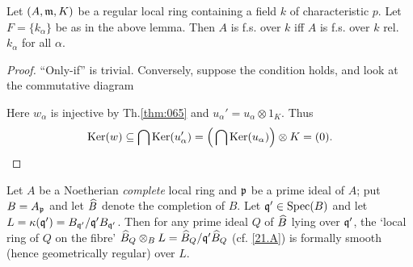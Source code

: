 \documentclass[../main]{subfiles}
\begin{document}
\begin{theorem}
\label{thm:067}
Let $(A, \mathfrak{m}, K)$ be a regular local ring containing a field $k$ of characteristic $p$. Let $F = \{k_\alpha\}$ be as in the above lemma. Then $A$ is f.s. over $k$ iff $A$ is f.s. over $k$ rel. $k_\alpha$ for all $\alpha$. 
\end{theorem}

\begin{proof}
``Only-if'' is trivial. Conversely, suppose the condition holds, and look at the commutative diagram

\begin{center}
\end{center}

Here $w_\alpha$ is injective by Th.\ref{thm:065} and $u_\alpha' = u_\alpha \otimes 1_K$. Thus \[\operatorname{Ker}(w) \subseteq \bigcap \operatorname{Ker}(u_\alpha') = \Big(\bigcap \operatorname{Ker}(u_\alpha)\Big) \otimes K = (0).\]
\end{proof}

\begin{partheorem}[Grothendieck]
\label{thm:068}
Let $A$ be a Noetherian \emph{complete} local ring and $\mathfrak{p}$ be a prime ideal of $A$; put $B = A_{\mathfrak{p}}$ and let $\widehat{B}$ denote the completion of $B$. Let ${\mathfrak{q}}' \in \operatorname{Spec}(B)$ and let $L = \kappa({\mathfrak{q}}') = B_{{\mathfrak{q}}'}/{\mathfrak{q}}' B_{{\mathfrak{q}}'}$. Then for any prime ideal $Q$ of $\widehat{B}$ lying over ${\mathfrak{q}}'$, the `local ring of $Q$ on the fibre' ${\widehat{B}}_Q \otimes_B L = {\widehat{B}}_Q/{\mathfrak{q}}' {\widehat{B}}_Q$ (cf. \ref{21.A}) is formally smooth (hence geometrically regular) over $L$.
\end{partheorem}
\end{document}
